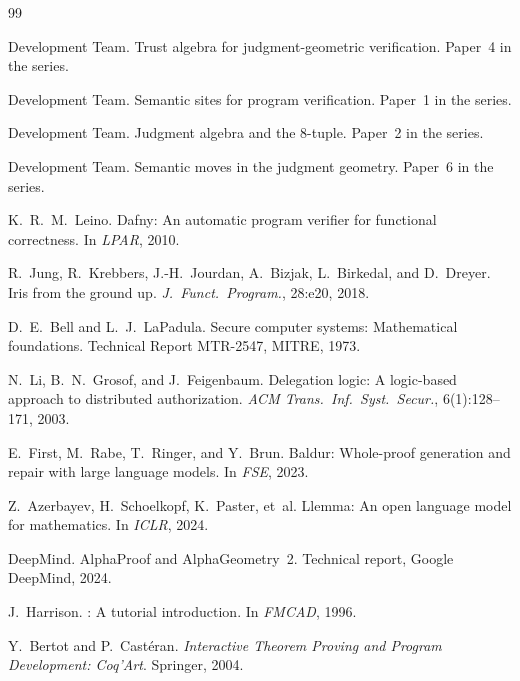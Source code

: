 \documentclass[11pt]{article}
\begin{document}

\begin{thebibliography}{99}

\JuGeo{} Development Team.
\newblock Trust algebra for judgment-geometric verification.
\newblock Paper~4 in the \JuGeo{} series.

\JuGeo{} Development Team.
\newblock Semantic sites for program verification.
\newblock Paper~1 in the \JuGeo{} series.

\JuGeo{} Development Team.
\newblock Judgment algebra and the 8-tuple.
\newblock Paper~2 in the \JuGeo{} series.

\JuGeo{} Development Team.
\newblock Semantic moves in the judgment geometry.
\newblock Paper~6 in the \JuGeo{} series.

K.~R.~M.~Leino.
\newblock Dafny: An automatic program verifier for functional correctness.
\newblock In \emph{LPAR}, 2010.

R.~Jung, R.~Krebbers, J.-H.~Jourdan, A.~Bizjak, L.~Birkedal, and
D.~Dreyer.
\newblock Iris from the ground up.
\newblock \emph{J.~Funct.~Program.}, 28:e20, 2018.

D.~E.~Bell and L.~J.~LaPadula.
\newblock Secure computer systems: Mathematical foundations.
\newblock Technical Report MTR-2547, MITRE, 1973.

N.~Li, B.~N.~Grosof, and J.~Feigenbaum.
\newblock Delegation logic: A logic-based approach to distributed authorization.
\newblock \emph{ACM Trans.~Inf.~Syst.~Secur.}, 6(1):128--171, 2003.

E.~First, M.~Rabe, T.~Ringer, and Y.~Brun.
\newblock Baldur: Whole-proof generation and repair with large language models.
\newblock In \emph{FSE}, 2023.

Z.~Azerbayev, H.~Schoelkopf, K.~Paster, et~al.
\newblock Llemma: An open language model for mathematics.
\newblock In \emph{ICLR}, 2024.

DeepMind.
\newblock AlphaProof and AlphaGeometry~2.
\newblock Technical report, Google DeepMind, 2024.

J.~Harrison.
: A tutorial introduction.
\newblock In \emph{FMCAD}, 1996.

Y.~Bertot and P.~Cast{\'e}ran.
\newblock \emph{Interactive Theorem Proving and Program Development: Coq'Art}.
\newblock Springer, 2004.


\end{thebibliography}
\end{document}
